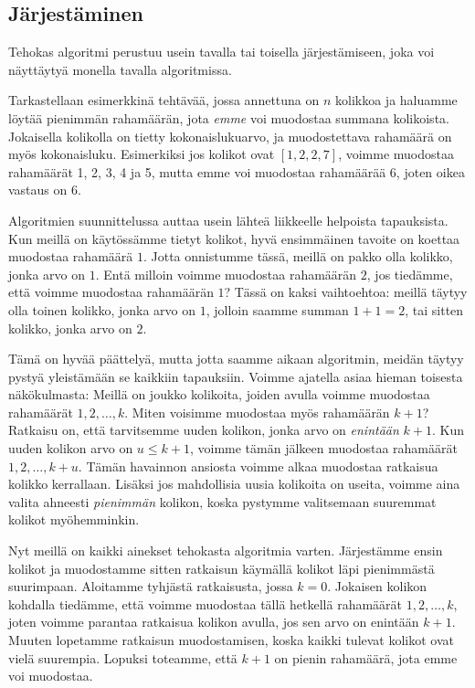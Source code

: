 \subsection{Järjestäminen}

Tehokas algoritmi perustuu usein tavalla tai
toisella järjestämiseen, joka voi näyttäytyä
monella tavalla algoritmissa.

Tarkastellaan esimerkkinä tehtävää, jossa annettuna on
$n$ kolikkoa ja haluamme löytää pienimmän rahamäärän,
jota \emph{emme} voi muodostaa summana kolikoista.
Jokaisella kolikolla on tietty kokonaislukuarvo, ja
muodostettava rahamäärä on myös kokonaisluku.
Esimerkiksi jos kolikot ovat $[1,2,2,7]$,
voimme muodostaa rahamäärät 1, 2, 3, 4 ja 5,
mutta emme voi muodostaa rahamäärää 6,
joten oikea vastaus on 6.

Algoritmien suunnittelussa auttaa usein
lähteä liikkeelle helpoista tapauksista.
Kun meillä on käytössämme tietyt kolikot,
hyvä ensimmäinen tavoite on koettaa muodostaa rahamäärä $1$.
Jotta onnistumme tässä, meillä on pakko olla kolikko,
jonka arvo on $1$.
Entä milloin voimme muodostaa rahamäärän $2$,
jos tiedämme, että voimme muodostaa rahamäärän $1$?
Tässä on kaksi vaihtoehtoa: meillä täytyy olla
toinen kolikko, jonka arvo on $1$, jolloin saamme
summan $1+1=2$, tai sitten kolikko, jonka arvo on $2$.

Tämä on hyvää päättelyä, mutta jotta saamme aikaan algoritmin,
meidän täytyy pystyä yleistämään se kaikkiin tapauksiin.
Voimme ajatella asiaa hieman toisesta näkökulmasta:
Meillä on joukko kolikoita, joiden avulla voimme muodostaa
rahamäärät $1,2,\dots,k$.
Miten voisimme muodostaa myös rahamäärän $k+1$?
Ratkaisu on, että tarvitsemme uuden kolikon,
jonka arvo on \emph{enintään} $k+1$.
Kun uuden kolikon arvo on $u \le k+1$,
voimme tämän jälkeen muodostaa rahamäärät $1,2,\dots,k+u$.
Tämän havainnon ansiosta voimme alkaa muodostaa ratkaisua
kolikko kerrallaan.
Lisäksi jos mahdollisia uusia kolikoita on useita,
voimme aina valita ahneesti \emph{pienimmän} kolikon,
koska pystymme valitsemaan suuremmat kolikot myöhemminkin.

Nyt meillä on kaikki ainekset tehokasta algoritmia varten.
Järjes\-tämme ensin kolikot ja muodostamme sitten ratkaisun
käymällä kolikot läpi pienimmästä suurimpaan.
Aloitamme tyhjästä ratkaisusta, jossa $k=0$.
Jokaisen kolikon kohdalla tiedämme,
että voimme muodostaa tällä hetkellä rahamäärät $1,2,\dots,k$,
joten voimme parantaa ratkaisua kolikon avulla,
jos sen arvo on enintään $k+1$.
Muuten lopetamme ratkaisun muodostamisen,
koska kaikki tulevat kolikot ovat vielä suurempia.
Lopuksi toteamme, että $k+1$ on pienin rahamäärä,
jota emme voi muodostaa.

